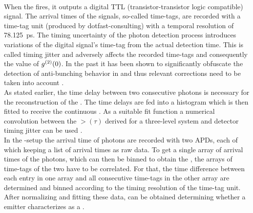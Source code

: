 		\\
		When the \APD fires, it outputs a digital TTL (transistor-transistor logic compatible) signal.
		The arrival times of the signals, so-called time-tags, are recorded with a time-tag unit (produced by dotfast-consulting) with a temporal resolution of \SI{78.125}{\pico\second}.
		The timing uncertainty of the photon detection process introduces variations of the digital signal's time-tag from the actual detection time.
		This is called timing jitter and adversely affects the recorded time-tags and consequently the value of $g^{(2)}(0)$. In the past it has been shown to significantly obfuscate the detection of anti-bunching behavior in \sps and thus relevant corrections need to be taken into account \cite{Neu2012, Riedrich-moller2014}.
		\\
		As stated earlier, the time delay between two consecutive photons is necessary for the reconstruction of the \gtf.
		The time delays are fed into a histogram which is then fitted to receive the continuous \gtf.
		As a suitable fit function a numerical convolution between the $\gt(\tau)$ derived for a three-level system and detector timing jitter can be used \cite{Neu2012b, Neu2012, Riedrich-moller2014}.
		\\
		In the \HBT{}-setup the arrival time of photons are recorded with two APDs, each of which keeping a list of arrival times as raw data.
		To get a single array of arrival times of the photons, which can then be binned to obtain the \gtf, the arrays of time-tags of the two \APDs have to be correlated.
		For that, the time difference between each entry in one array and all consecutive time-tags in the other array are determined and binned according to the timing resolution of the time-tag unit.
		After normalizing and fitting these data, \gtz can be obtained determining whether a emitter characterizes as a \sps.
